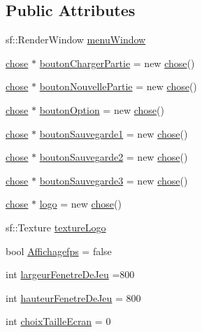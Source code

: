 \subsection*{Public Attributes}
\begin{DoxyCompactItemize}
\item 
sf\+::\+Render\+Window \mbox{\hyperlink{classmenu_a578cdf33520b87a66c91123b56026d47}{menu\+Window}}
\item 
\mbox{\hyperlink{classchose}{chose}} $\ast$ \mbox{\hyperlink{classmenu_a4aa7938e119d5bc7878d2730c9634804}{bouton\+Charger\+Partie}} = new \mbox{\hyperlink{classchose}{chose}}()
\item 
\mbox{\hyperlink{classchose}{chose}} $\ast$ \mbox{\hyperlink{classmenu_ab8578fcf6302936279a95b52d334fd2f}{bouton\+Nouvelle\+Partie}} = new \mbox{\hyperlink{classchose}{chose}}()
\item 
\mbox{\hyperlink{classchose}{chose}} $\ast$ \mbox{\hyperlink{classmenu_a68804b63c03d72f1666547f1f383b187}{bouton\+Option}} = new \mbox{\hyperlink{classchose}{chose}}()
\item 
\mbox{\hyperlink{classchose}{chose}} $\ast$ \mbox{\hyperlink{classmenu_a1b8fc8c5fd7494565d5da06bc6f10873}{bouton\+Sauvegarde1}} = new \mbox{\hyperlink{classchose}{chose}}()
\item 
\mbox{\hyperlink{classchose}{chose}} $\ast$ \mbox{\hyperlink{classmenu_a51d5cbcc3b92d8b4deac94e6dc9486f5}{bouton\+Sauvegarde2}} = new \mbox{\hyperlink{classchose}{chose}}()
\item 
\mbox{\hyperlink{classchose}{chose}} $\ast$ \mbox{\hyperlink{classmenu_a50f231644fcb472c3ac583df94a5f485}{bouton\+Sauvegarde3}} = new \mbox{\hyperlink{classchose}{chose}}()
\item 
\mbox{\hyperlink{classchose}{chose}} $\ast$ \mbox{\hyperlink{classmenu_a80c548101db506cce4efacb0ed3f7797}{logo}} = new \mbox{\hyperlink{classchose}{chose}}()
\item 
sf\+::\+Texture \mbox{\hyperlink{classmenu_a5376bd9808b2c69d5dfd59608077163a}{texture\+Logo}}
\item 
bool \mbox{\hyperlink{classmenu_a8028b36a095c8817773609976d63ced2}{Affichagefps}} = false
\item 
int \mbox{\hyperlink{classmenu_a8d48c6df67669851f7d0d7420c859712}{largeur\+Fenetre\+De\+Jeu}} =800
\item 
int \mbox{\hyperlink{classmenu_ac872a1f3dae51cbf6867bc6d68f7942a}{hauteur\+Fenetre\+De\+Jeu}} = 800
\item 
int \mbox{\hyperlink{classmenu_abe50013aa2c10b0fc2afb5e8d6e7ae85}{choix\+Taille\+Ecran}} = 0

\end{DoxyCompactItemize}
